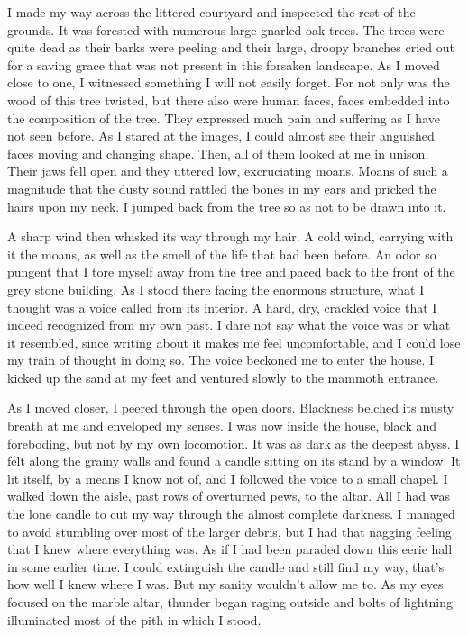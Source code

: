 I made my way across the littered courtyard and inspected the rest of
the grounds. It was forested with numerous large gnarled oak trees. The
trees were quite dead as their barks were peeling and their large,
droopy branches cried out for a saving grace that was not present in
this forsaken landscape. As I moved close to one, I witnessed something
I will not easily forget. For not only was the wood of this tree
twisted, but there also were human faces, faces embedded into the
composition of the tree. They expressed much pain and suffering as I
have not seen before. As I stared at the images, I could almost see
their anguished faces moving and changing shape. Then, all of them
looked at me in unison. Their jaws fell open and they uttered low,
excruciating moans. Moans of such a magnitude that the dusty sound
rattled the bones in my ears and pricked the hairs upon my neck. I
jumped back from the tree so as not to be drawn into it.

A sharp wind then whisked its way through my hair. A cold wind, carrying
with it the moans, as well as the smell of the life that had been
before. An odor so pungent that I tore myself away from the tree and
paced back to the front of the grey stone building. As I stood there
facing the enormous structure, what I thought was a voice called from
its interior. A hard, dry, crackled voice that I indeed recognized from
my own past. I dare not say what the voice was or what it resembled,
since writing about it makes me feel uncomfortable, and I could lose my
train of thought in doing so. The voice beckoned me to enter the house.
I kicked up the sand at my feet and ventured slowly to the mammoth
entrance.

As I moved closer, I peered through the open doors. Blackness belched
its musty breath at me and enveloped my senses. I was now inside the
house, black and foreboding, but not by my own locomotion. It was as
dark as the deepest abyss. I felt along the grainy walls and found a
candle sitting on its stand by a window. It lit itself, by a means I
know not of, and I followed the voice to a small chapel. I walked down
the aisle, past rows of overturned pews, to the altar. All I had was the
lone candle to cut my way through the almost complete darkness. I
managed to avoid stumbling over most of the larger debris, but I had
that nagging feeling that I knew where everything was. As if I had been
paraded down this eerie hall in some earlier time. I could extinguish
the candle and still find my way, that's how well I knew where I was.
But my sanity wouldn't allow me to. As my eyes focused on the marble
altar, thunder began raging outside and bolts of lightning illuminated
most of the pith in which I stood.

